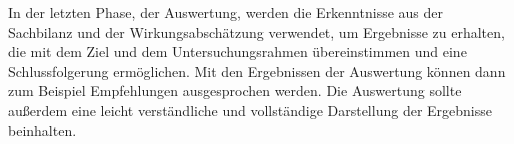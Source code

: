In der letzten Phase, der Auswertung, werden die Erkenntnisse aus der Sachbilanz und der Wirkungsabschätzung verwendet, um Ergebnisse zu erhalten, die mit dem Ziel und dem Untersuchungsrahmen übereinstimmen und eine Schlussfolgerung ermöglichen. Mit den Ergebnissen der Auswertung können dann zum Beispiel Empfehlungen ausgesprochen werden. Die Auswertung sollte außerdem eine leicht verständliche und vollständige Darstellung der Ergebnisse beinhalten.